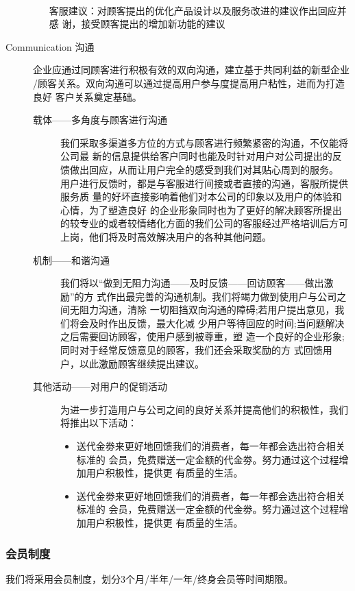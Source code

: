 \documentclass[master]{hduthesis}
\begin{document}
\begin{description}
\begin{enumerate}[1)]
			      \\客服建议：对顾客提出的优化产品设计以及服务改进的建议作出回应并感 谢，接受顾客提出的增加新功能的建议
		\end{enumerate}
	\item [Communication 沟通]
	      企业应通过同顾客进行积极有效的双向沟通，建立基于共同利益的新型企业 /顾客关系。双向沟通可以通过提高用户参与度提高用户粘性，进而为打造良好 客户关系奠定基础。
	      \begin{description}
		      \item[载体——多角度与顾客进行沟通]
			      我们采取多渠道多方位的方式与顾客进行频繁紧密的沟通，不仅能将公司最 新的信息提供给客户同时也能及时针对用户对公司提出的反馈做出回应，从而让用户完全的感受到我们对其贴心周到的服务。\\用户进行反馈时，都是与客服进行间接或者直接的沟通，客服所提供服务质 量的好坏直接影响着他们对本公司的印象以及用户的体验和心情，为了塑造良好 的企业形象同时也为了更好的解决顾客所提出的较专业的或者较情绪化方面的我们公司的客服经过严格培训后方可上岗，他们将及时高效解决用户的各种其他问题。
		      \item[机制——和谐沟通 ]
			      我们将以“做到无阻力沟通——及时反馈——回访顾客——做出激励”的方 式作出最完善的沟通机制。我们将竭力做到使用户与公司之间无阻力沟通，清除 一切阻挡双向沟通的障碍;若用户提出意见，我们将会及时作出反馈，最大化减 少用户等待回应的时间;当问题解决之后需要回访顾客，使用户感到被尊重，塑 造一个良好的企业形象;同时对于经常反馈意见的顾客，我们还会采取奖励的方 式回馈用户，以此激励顾客继续提出建议。
		      \item[其他活动——对用户的促销活动]
			      为进一步打造用户与公司之间的良好关系并提高他们的积极性，我们将推出以下活动：
			      \begin{itemize}
				      \item 送代金劵来更好地回馈我们的消费者，每一年都会选出符合相关标准的 会员，免费赠送一定金额的代金劵。努力通过这个过程增加用户积极性，提供更 有质量的生活。
				      \item 送代金劵来更好地回馈我们的消费者，每一年都会选出符合相关标准的 会员，免费赠送一定金额的代金劵。努力通过这个过程增加用户积极性，提供更 有质量的生活。
			      \end{itemize}
	      \end{description}
\end{description}
\subsubsection{会员制度}
我们将采用会员制度，划分3个月/半年/一年/终身会员等时间期限。
\end{document}
